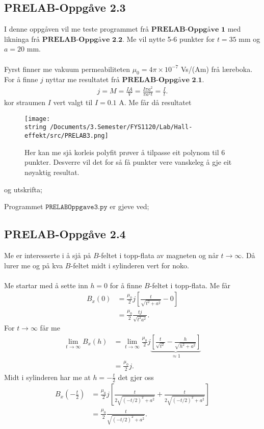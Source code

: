 \documentclass[11pt, a4paper]{article}
\theoremstyle{definition}
\begin{document}
  \subsection*{PRELAB-Oppgåve 2.3}
    I denne oppgåven vil me teste programmet frå $\textbf{PRELAB-Oppgåve 1}$ med likninga frå $\textbf{PRELAB-Oppgåve 2.2}$.
    Me vil nytte 5-6 punkter for $t = 35$ mm og $a = 20$ mm. \\ \\
    Fyrst finner me vakuum permeabiliteten $\mu_0 = 4\pi \times 10^{-7}$ Vs/(Am) frå læreboka. For å finne $j$ nyttar me resultatet frå $\textbf{PRELAB-Oppgåve 2.1}$.
    \begin{align*}
      j = M = \frac{IA}{V} = \frac{I\pi a^2}{\pi a^2t} = \frac{I}{t}.
    \end{align*}
    kor straumen $I$ vert valgt til $I = 0.1$ A. Me får då resultatet
    \begin{figure}[H]
      \centering
      \texttt{[image: \\string~/Documents/3.Semester/FYS1120/Lab/Hall-effekt/src/PRELAB3.png]}
      \caption{Her kan me sjå korleis polyfit prøver å tilpasse eit polynom til 6 punkter. Desverre vil det for så få punkter vere vanskeleg å gje eit nøyaktig resultat.}
    \end{figure}
    og utskrifta;
    
    Programmet $\texttt{PRELABOppgave3.py}$ er gjeve ved;
    

  \subsection*{PRELAB-Oppgåve 2.4}
    Me er interesserte i å sjå på $B$-feltet i topp-flata av magneten og når $t \to \infty$. Då lurer me og på kva $B$-feltet midt i sylinderen vert for noko. \\ \\
    Me startar med å sette inn $h = 0$ for å finne $B$-feltet i topp-flata. Me får
    \begin{align*}
      B_x(0) &= \frac{\mu_0}{2}j\left[ \frac{t}{\sqrt{t^2 + a^2}} - 0 \right] \\
      &= \frac{\mu_0}{2}\frac{tj}{\sqrt{t^2 a^2}}.
    \end{align*}
    For $t \to \infty$ får me
    \begin{align*}
      \lim_{t \to \infty} B_x(h) &= \lim_{t \to \infty} \frac{\mu_0}{2}j\underbrace{\left[ \frac{t}{\sqrt{t^2}} - \frac{h}{\sqrt{h^2 + a^2}} \right]}_{\approx 1} \\
      &= \frac{\mu_0}{2}j.
    \end{align*}
    Midt i sylinderen har me at $h = -\frac{t}{2}$ det gjer oss
    \begin{align*}
      B_x(-\frac{t}{2}) &= \frac{\mu_0}{2}j\left[ \frac{t}{2\sqrt{(-t/2)^2 + a^2}} + \frac{t}{2\sqrt{(-t/2)^2 + a^2}} \right] \\
      &= \frac{\mu_0}{2}\frac{t}{\sqrt{(-t/2)^2 + a^2}}.
    \end{align*}
\end{document}
